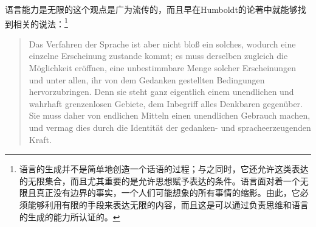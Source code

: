 语言能力是无限的这个观点是广为流传的，而且早在Humboldt的论著中就能够找到相关的说法：\footnote{
语言的生成并不是简单地创造一个话语的过程；与之同时，它还允许这类表达的无限集合，而且尤其重要的是允许思想赋予表达的条件。语言面对着一个无限且真正没有边界的事实，一个人们可能想象的所有事情的缩影。由此，它必须能够利用有限的手段来表达无限的内容，而且这是可以通过负责思维和语言的生成的能力所认证的。
}
\begin{quote}
Das Verfahren der Sprache ist aber nicht bloß ein solches, wodurch eine einzelne Erscheinung zustande kommt;
es muss derselben zugleich die Möglichkeit eröffnen, eine unbestimmbare Menge solcher Erscheinungen und unter allen,
ihr von dem Gedanken gestellten Bedingungen hervorzubringen.
Denn sie steht ganz eigentlich einem unendlichen und wahrhaft grenzenlosen Gebiete, dem Inbegriff alles
Denk\-baren gegenüber. Sie muss daher von endlichen Mitteln einen unendlichen Gebrauch machen, und
vermag dies durch die Identität der gedanken- und sprache\-erzeugenden Kraft.  \citep[]{Humboldt88a-u}
\end{quote}

